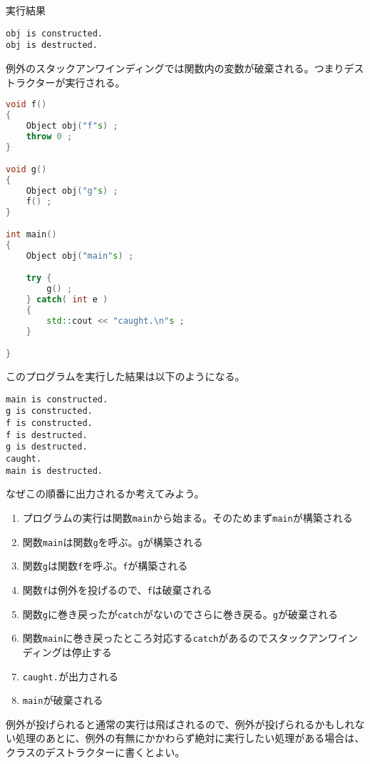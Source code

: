実行結果

\begin{lstlisting}[style=terminal]
obj is constructed.
obj is destructed.
\end{lstlisting}

例外のスタックアンワインディングでは関数内の変数が破棄される。つまりデストラクターが実行される。

\ifTombow\pagebreak\fi
\begin{lstlisting}[language={C++}]
void f()
{
    Object obj("f"s) ;
    throw 0 ;
}

void g()
{
    Object obj("g"s) ;
    f() ;
}

int main()
{
    Object obj("main"s) ;

    try {
        g() ;
    } catch( int e )
    {
        std::cout << "caught.\n"s ;
    }

}
\end{lstlisting}

このプログラムを実行した結果は以下のようになる。

\begin{lstlisting}[style=terminal]
main is constructed.
g is constructed.
f is constructed.
f is destructed.
g is destructed.
caught.
main is destructed.
\end{lstlisting}

なぜこの順番に出力されるか考えてみよう。

\begin{enumerate}
\def\labelenumi{\arabic{enumi}.}
\item
  プログラムの実行は関数\texttt{main}から始まる。そのためまず\texttt{main}が構築される
\item
  関数\texttt{main}は関数\texttt{g}を呼ぶ。\texttt{g}が構築される
\item
  関数\texttt{g}は関数\texttt{f}を呼ぶ。\texttt{f}が構築される
\item
  関数\texttt{f}は例外を投げるので、\texttt{f}は破棄される
\item
  関数\texttt{g}に巻き戻ったが\texttt{catch}がないのでさらに巻き戻る。\texttt{g}が破棄される
\item
  関数\texttt{main}に巻き戻ったところ対応する\texttt{catch}があるのでスタックアンワインディングは停止する
\item
  \texttt{caught.}が出力される
\item
  \texttt{main}が破棄される
\end{enumerate}

例外が投げられると通常の実行は飛ばされるので、例外が投げられるかもしれない処理のあとに、例外の有無にかかわらず絶対に実行したい処理がある場合は、クラスのデストラクターに書くとよい。

